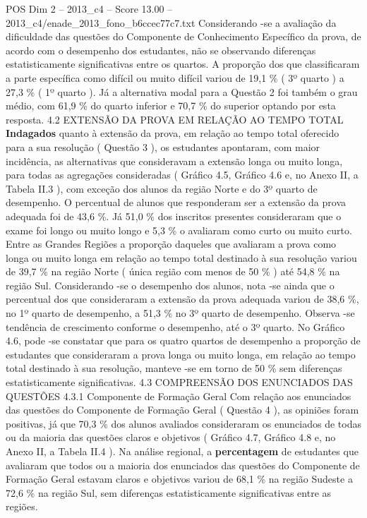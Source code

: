 \begin{textsample}{POS Dim 2 – 2013\_c4 – Score 13.00 – 2013\_c4/enade\_2013\_fono\_b6ccec77c7.txt}
Considerando -se a avaliação da dificuldade das questões do Componente de Conhecimento Específico da prova, de acordo com o desempenho dos estudantes, não se observando diferenças estatisticamente significativas entre os quartos.
A proporção dos que classificaram a parte específica como difícil ou muito difícil variou de 19,1 \% ( 3º quarto ) a 27,3 \% ( 1º quarto ).
Já a alternativa modal para a Questão 2 foi também o grau médio, com 61,9 \% do quarto inferior e 70,7 \% do superior optando por esta resposta. 4.2 EXTENSÃO DA PROVA EM RELAÇÃO AO TEMPO TOTAL \textbf{Indagados} quanto à extensão da prova, em relação ao tempo total oferecido para a sua resolução ( Questão 3 ), os estudantes apontaram, com maior incidência, as alternativas que consideravam a extensão longa ou muito longa, para todas as agregações consideradas ( Gráfico 4.5, Gráfico 4.6 e, no Anexo II, a Tabela II.3 ), com exceção dos alunos da região Norte e do 3º quarto de desempenho.
O percentual de alunos que responderam ser a extensão da prova adequada foi de 43,6 \%.
Já 51,0 \% dos inscritos presentes consideraram que o exame foi longo ou muito longo e 5,3 \% o avaliaram como curto ou muito curto.
Entre as Grandes Regiões a proporção daqueles que avaliaram a prova como longa ou muito longa em relação ao tempo total destinado à sua resolução variou de 39,7 \% na região Norte ( única região com menos de 50 \% ) até 54,8 \% na região Sul.
Considerando -se o desempenho dos alunos, nota -se ainda que o percentual dos que consideraram a extensão da prova adequada variou de 38,6 \%, no 1º quarto de desempenho, a 51,3 \% no 3º quarto de desempenho.
Observa -se tendência de crescimento conforme o desempenho, até o 3º quarto.
No Gráfico 4.6, pode -se constatar que para os quatro quartos de desempenho a proporção de estudantes que consideraram a prova longa ou muito longa, em relação ao tempo total destinado à sua resolução, manteve -se em torno de 50 \% sem diferenças estatisticamente significativas. 4.3 COMPREENSÃO DOS ENUNCIADOS DAS QUESTÕES 4.3.1 Componente de Formação Geral Com relação aos enunciados das questões do Componente de Formação Geral ( Questão 4 ), as opiniões foram positivas, já que 70,3 \% dos alunos avaliados consideraram os enunciados de todas ou da maioria das questões claros e objetivos ( Gráfico 4.7, Gráfico 4.8 e, no Anexo II, a Tabela II.4 ).
Na análise regional, a \textbf{percentagem} de estudantes que avaliaram que todos ou a maioria dos enunciados das questões do Componente de Formação Geral estavam claros e objetivos variou de 68,1 \% na região Sudeste a 72,6 \% na região Sul, sem diferenças estatisticamente significativas entre as regiões.

\end{textsample}
